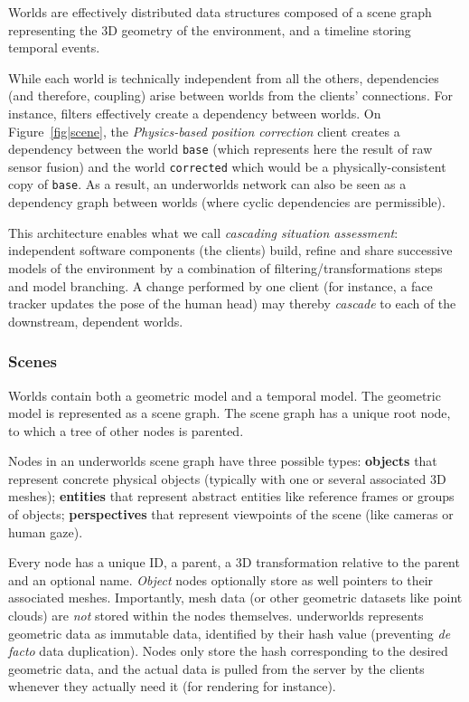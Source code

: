 \documentclass[letterpaper, 10pt, conference]{ieeeconf}
\newcommand{\etc}{etc.\xspace}
\newcommand{\uwds}{{\sc underworlds}\xspace}
\begin{document}
Worlds are effectively distributed data structures composed of a scene graph
representing the 3D geometry of the environment, and a timeline storing temporal
events.

While each world is technically independent from all the others, dependencies
(and therefore, coupling) arise between worlds from the clients' connections.
For instance, filters effectively create a dependency between worlds. On
Figure~\ref{fig|scene}, the \textit{Physics-based position correction} client
creates a dependency between the world {\tt base} (which represents here the
result of raw sensor fusion) and the world {\tt corrected} which would be a
physically-consistent copy of {\tt base}.  As a result, an \uwds network can
also be seen as a dependency graph between worlds (where cyclic dependencies
are permissible).

This architecture enables what we call \emph{cascading situation assessment}:
independent software components (the clients) build, refine and share
successive models of the environment by a combination of
filtering/transformations steps and model branching. A change performed by one
client (for instance, a face tracker updates the pose of the human head) may
thereby \emph{cascade} to each of the downstream, dependent worlds.

\subsubsection{Scenes}

Worlds contain both a geometric model and a temporal model. The geometric
model is represented as a scene graph. The scene graph has a unique root node,
to which a tree of other nodes is parented.

Nodes in an \uwds scene graph have three possible types: \textbf{objects} that
represent concrete physical objects (typically with one or several associated 3D
meshes); \textbf{entities} that represent abstract entities like reference
frames or groups of objects; \textbf{perspectives} that represent viewpoints
of the scene (like cameras or human gaze).

Every node has a unique ID, a parent, a 3D transformation relative to the parent
and an optional name. \emph{Object} nodes optionally store as well pointers to
their associated meshes. Importantly, mesh data (or other geometric datasets
like point clouds) are \emph{not} stored within the nodes themselves. \uwds
represents geometric data as immutable data, identified by their hash value
(preventing \textit{de facto} data duplication).  Nodes only store the hash
corresponding to the desired geometric data, and the actual data is pulled from
the server by the clients whenever they actually need it (for rendering for
instance).
\end{document}
